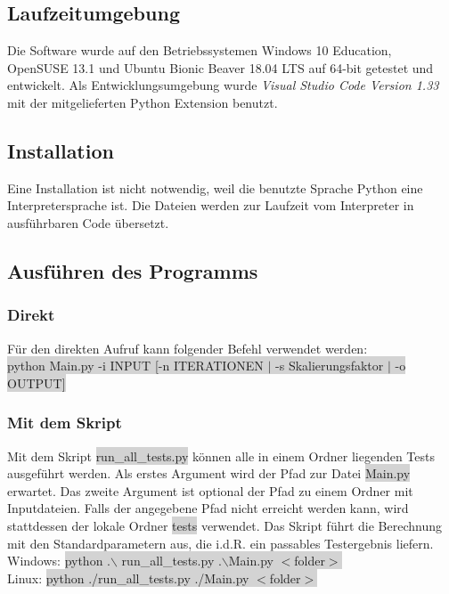 \documentclass[a4paper,11pt]{article}
\begin{document}
{\subsection{Laufzeitumgebung}
Die Software wurde auf den Betriebssystemen Windows 10 Education, OpenSUSE 13.1 und Ubuntu Bionic Beaver 18.04 LTS auf 64-bit getestet und entwickelt. Als Entwicklungsumgebung wurde \textit{Visual Studio Code Version 1.33}
mit der mitgelieferten Python Extension benutzt. 

\subsection{Installation}

Eine Installation ist nicht notwendig, weil die benutzte Sprache Python eine Interpretersprache ist. Die Dateien werden zur Laufzeit vom Interpreter in ausf\"uhrbaren Code \"ubersetzt.


\subsection{Ausführen des Programms}
\subsubsection{Direkt}
F\"ur den direkten Aufruf kann folgender Befehl verwendet werden:\\
\colorbox{lightgray}{python Main.py -i INPUT [-n ITERATIONEN $|$ -s Skalierungsfaktor $|$ -o OUTPUT]}

\subsubsection{Mit dem Skript}
Mit dem Skript \colorbox{lightgray}{run\_all\_tests.py} k\"onnen alle in einem Ordner liegenden Tests ausgef\"uhrt werden. Als erstes Argument wird der Pfad zur Datei \colorbox{lightgray}{Main.py} erwartet. Das zweite Argument
ist optional der Pfad zu einem Ordner mit Inputdateien. Falls der angegebene Pfad nicht erreicht werden kann, wird stattdessen der lokale Ordner \colorbox{lightgray}{tests}
verwendet. Das Skript f\"uhrt die Berechnung mit den Standardparametern aus, die i.d.R. ein passables Testergebnis liefern.\\
Windows: \colorbox{lightgray}{python .$\backslash$ run\_all\_tests.py .$\backslash$Main.py $<$folder$>$}\\
Linux: \colorbox{lightgray}{python ./run\_all\_tests.py ./Main.py $<$folder$>$}\\
}
\end{document}
